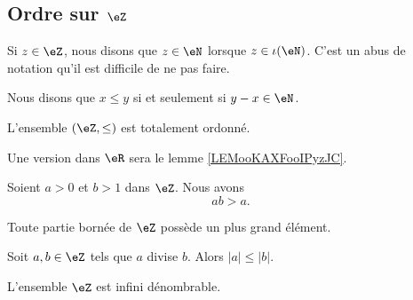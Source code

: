 \subsection{Ordre sur \( \eZ\)}

Si \( z\in \eZ\), nous disons que \( z\in \eN\) lorsque \( z\in \iota(\eN)\). C'est un abus de notation qu'il est difficile de ne pas faire.

\begin{propositionDef}       \label{PROPooMYYDooOABOdB}
    Nous disons que \( x\leq y\) si et seulement si \( y-x\in \eN\).

    L'ensemble \( (\eZ, \leq)\) est totalement ordonné.
\end{propositionDef}

Une version dans \( \eR\) sera le lemme \ref{LEMooKAXFooIPyzJC}.
\begin{lemma}       \label{LEMooSVDDooWsyxNP}
    Soient \( a>0\) et \( b>1\) dans \( \eZ\). Nous avons
    \begin{equation}
        ab>a.
    \end{equation}
\end{lemma}

\begin{lemma}       \label{LEMooMYEIooNFwNVI}
    Toute partie bornée de \( \eZ\) possède un plus grand élément.
\end{lemma}

\begin{proposition}     \label{PROPooYJBMooZrzkNX}
    Soit \( a,b\in \eZ\) tels que \( a\) divise \( b\). Alors \( | a |\leq | b |\).
\end{proposition}

\begin{lemma}       \label{LEMooJNXIooBmdOVi}
    L'ensemble \( \eZ\) est infini dénombrable.
\end{lemma}

